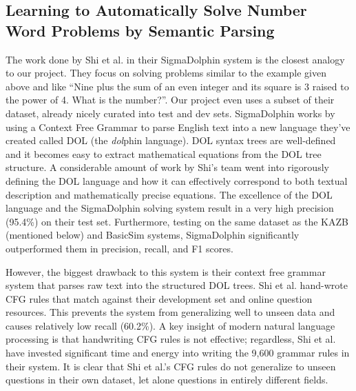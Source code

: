 \documentclass[11pt]{article}
\begin{document}
\subsection{Learning to Automatically Solve Number Word Problems by Semantic Parsing}
The work done by Shi et al.  in their SigmaDolphin system is the closest analogy to our project. They focus on solving problems similar to the example given above and like ``Nine plus the sum of an even integer and its square is 3 raised to the power of 4. What is the number?''. Our project even uses a subset of their dataset, already nicely curated into test and dev sets. SigmaDolphin works by using a Context Free Grammar to parse English text into a new language they’ve created called DOL (the \textit{dol}phin language). DOL syntax trees are well-defined and it becomes easy to extract mathematical equations from the DOL tree structure. A considerable amount of work by Shi’s team went into rigorously defining the DOL language and how it can effectively correspond to both textual description and mathematically precise equations. The excellence of the DOL language and the SigmaDolphin solving system result in a very high precision (95.4\%) on their test set. Furthermore, testing on the same dataset as the KAZB (mentioned below) and BasicSim systems, SigmaDolphin significantly outperformed them in precision, recall, and F1 scores.

However, the biggest drawback to this system is their context free grammar system that parses raw text into the structured DOL trees. Shi et al. hand-wrote CFG rules that match against their development set and online question resources. This prevents the system from generalizing well to unseen data and causes relatively low recall (60.2\%). A key insight of modern natural language processing is that handwriting CFG rules is not effective; regardless, Shi et al. have invested significant time and energy into writing the 9,600 grammar rules in their system. It is clear that Shi et al.’s CFG rules do not generalize to unseen questions in their own dataset, let alone questions in entirely different fields.
\end{document}
